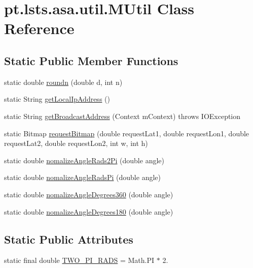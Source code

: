 \hypertarget{classpt_1_1lsts_1_1asa_1_1util_1_1MUtil}{}\section{pt.\+lsts.\+asa.\+util.\+M\+Util Class Reference}
\label{classpt_1_1lsts_1_1asa_1_1util_1_1MUtil}
\subsection*{Static Public Member Functions}
\begin{DoxyCompactItemize}
\item 
static double \hyperlink{classpt_1_1lsts_1_1asa_1_1util_1_1MUtil_a7689d9691597f8d7385d2b500b34d6f2}{roundn} (double d, int n)
\item 
static String \hyperlink{classpt_1_1lsts_1_1asa_1_1util_1_1MUtil_a2c7c343f4a64a22bf8271c44d07d7326}{get\+Local\+Ip\+Address} ()
\item 
static String \hyperlink{classpt_1_1lsts_1_1asa_1_1util_1_1MUtil_acae08ebd1baa26894e2a01cfafd95926}{get\+Broadcast\+Address} (Context m\+Context)  throws I\+O\+Exception 
\item 
static Bitmap \hyperlink{classpt_1_1lsts_1_1asa_1_1util_1_1MUtil_ab9d522d6ac82d66fbca6a08e43d5e9e4}{request\+Bitmap} (double request\+Lat1, double request\+Lon1, double request\+Lat2, double request\+Lon2, int w, int h)
\item 
static double \hyperlink{classpt_1_1lsts_1_1asa_1_1util_1_1MUtil_a516d19547bbc79d4948f99873f5d4c45}{nomalize\+Angle\+Rads2\+Pi} (double angle)
\item 
static double \hyperlink{classpt_1_1lsts_1_1asa_1_1util_1_1MUtil_a30bd72a5910d8ba33a4a710a159ac9d0}{nomalize\+Angle\+Rads\+Pi} (double angle)
\item 
static double \hyperlink{classpt_1_1lsts_1_1asa_1_1util_1_1MUtil_a963bc991b41c2d848fb68500207774e9}{nomalize\+Angle\+Degrees360} (double angle)
\item 
static double \hyperlink{classpt_1_1lsts_1_1asa_1_1util_1_1MUtil_aa1ccf111d7ba733e7e22e9e08c294204}{nomalize\+Angle\+Degrees180} (double angle)
\end{DoxyCompactItemize}
\subsection*{Static Public Attributes}
\begin{DoxyCompactItemize}
\item 
static final double \hyperlink{classpt_1_1lsts_1_1asa_1_1util_1_1MUtil_a26d21613af5d7dd4eb7106987b409f76}{T\+W\+O\+\_\+\+P\+I\+\_\+\+R\+A\+D\+S} = Math.\+P\+I $\ast$ 2.
\end{DoxyCompactItemize}
